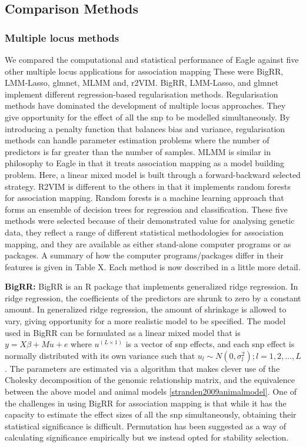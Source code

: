 \documentclass{nature}
\begin{document}
\subsection{Comparison Methods}

\subsubsection{Multiple locus methods}

We compared the computational and statistical performance of Eagle against five other multiple locus applications for 
association mapping  These were BigRR, LMM-Lasso, glmnet, MLMM  and, r2VIM. 
BigRR, LMM-Lasso, and glmnet  implement different regression-based regularisation methods. Regularisation methods have dominated 
the development of multiple locus approaches.  They give opportunity for the effect of all the snp to be modelled simultaneously. 
By introducing a penalty function that balances bias and variance, regularisation methods can 
handle parameter estimation problems where the number of predictors is far greater than the number of samples.  
MLMM is similar in philosophy to Eagle in that it treats association mapping as a model building problem. Here, a linear mixed 
model is built through a forward-backward selected strategy.  
R2VIM is different to the others in that it implements 
random forests for association mapping. 
Random forests is a machine learning approach that forms an ensemble of decision trees for regression and 
classification. 
These five methods were selected because of their demonstrated value 
for analysing genetic data, they reflect a range of different statistical methodologies for association mapping, and they are available as 
either stand-alone computer programs or as  packages. A summary of how the computer programs/packages differ in their 
features is given in Table X. Each method is now described in a little more detail. 



\textbf{BigRR:} BigRR \cite{shen2013novel}  is an R package that implements generalized ridge regression.
In ridge regression, the coefficients of the predictors are shrunk 
to zero by a constant amount.  In generalized ridge regression, the amount of shrinkage is allowed to vary, giving opportunity for 
a more realistic model to be specified. The model used in BigRR can be formulated as a linear mixed model that is 
$y = X \beta + M u + e$ where $u^{(L \times 1)}$ is a vector of snp effects, and each snp 
effect is normally distributed with its own variance such that $u_l \sim N(0, \sigma^2_l); l=1,2, \ldots, L$. 
The parameters are estimated via a 
algorithm that makes clever use of the Cholesky decomposition of the genomic relationship matrix, 
and the equivalence between the above model and animal models \ref{stranden2009animalmodel}. 
One of the challenges in using BigRR for association mapping is that while it has the capacity to estimate the effect sizes of all the snp simultaneously, 
obtaining their statistical significance is difficult. 
Permutation has been suggested as a way of calculating significance 
empirically \cite{shen2013novel} but we instead opted for stability selection.
\end{document}
